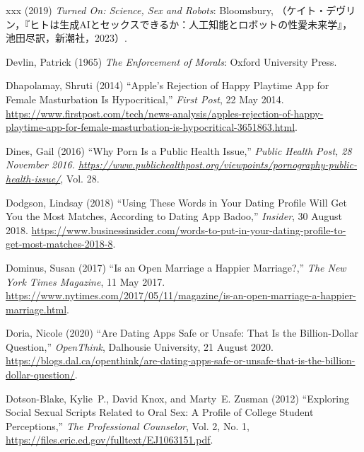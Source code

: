 \documentclass[]{jlreq} \usepackage{mystyle}
\begin{document}
\begin{thebibliography}{xxx}
 \bysame{}  (2019)  \textit{ Turned On: Science, Sex and Robots}: Bloomsbury,
  （ケイト・デヴリン，『ヒトは生成AIとセックスできるか：人工知能とロボットの性愛未来学』，池田尽訳，新潮社，2023）.

Devlin, Patrick (1965)  \textit{ The Enforcement of Morals}: Oxford University
  Press.

Dhapolamay, Shruti (2014) ``Apple's Rejection of Happy Playtime App for Female
  Masturbation Is Hypocritical,'' \emph{First Post}, 22 May 2014.
  \url{https://www.firstpost.com/tech/news-analysis/apples-rejection-of-happy-playtime-app-for-female-masturbation-is-hypocritical-3651863.html}.

Dines, Gail (2016) ``Why Porn Is a Public Health Issue,'' \textit{ \emph{Public
  Health Post}, 28 November 2016.
  \url{https://www.publichealthpost.org/viewpoints/pornography-public-health-issue/}},
  Vol. 28.

Dodgson, Lindsay (2018) ``Using These Words in Your Dating Profile Will Get You
  the Most Matches, According to Dating App Badoo,'' \emph{Insider}, 30 August
  2018.
  \url{https://www.businessinsider.com/words-to-put-in-your-dating-profile-to-get-most-matches-2018-8}.

Dominus, Susan (2017) ``Is an Open Marriage a Happier Marriage?,'' \emph{The
  New York Times Magazine}, 11 May 2017.
  \url{https://www.nytimes.com/2017/05/11/magazine/is-an-open-marriage-a-happier-marriage.html}.

Doria, Nicole (2020) ``Are Dating Apps Safe or Unsafe: That Is the
  Billion-Dollar Question,'' \emph{OpenThink}, Dalhousie University, 21 August
  2020.
  \url{https://blogs.dal.ca/openthink/are-dating-apps-safe-or-unsafe-that-is-the-billion-dollar-question/}.

Dotson-Blake, Kylie~P., David Knox, and Marty~E. Zusman (2012) ``Exploring
  Social Sexual Scripts Related to Oral Sex: A Profile of College Student
  Perceptions,'' \textit{ The Professional Counselor}, Vol. 2, No. 1,
  \url{https://files.eric.ed.gov/fulltext/EJ1063151.pdf}.


\end{thebibliography}
\end{document}
